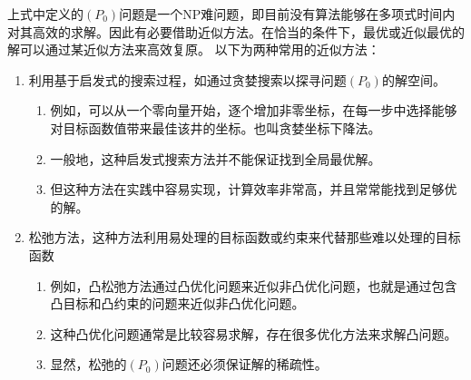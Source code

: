 上式中定义的$ (P_0) $问题是一个NP难问题，即目前没有算法能够在多项式时间内对其高效的求解。因此有必要借助近似方法。在恰当的条件下，最优或近似最优的解可以通过某近似方法来高效复原。
以下为两种常用的近似方法：
\begin{enumerate}
	\item {\heiti 利用基于启发式的搜索过程}，如通过贪婪搜索以探寻问题$ (P_0) $的解空间。
	\begin{enumerate}
		\item 例如，可以从一个零向量开始，逐个增加非零坐标，在每一步中选择能够对目标函数值带来最佳该井的坐标。也叫贪婪坐标下降法。
		\item 一般地，这种启发式搜索方法并不能保证找到全局最优解。
		\item 但这种方法在实践中容易实现，计算效率非常高，并且常常能找到足够优的解。
	\end{enumerate}
    \item {\heiti 松弛方法}，这种方法利用易处理的目标函数或约束来代替那些难以处理的目标函数
    \begin{enumerate}
    	\item 例如，凸松弛方法通过凸优化问题来近似非凸优化问题，也就是通过包含凸目标和凸约束的问题来近似非凸优化问题。
    	\item 这种凸优化问题通常是比较容易求解，存在很多优化方法来求解凸问题。
    	\item 显然，松弛的$ (P_0) $问题还必须保证解的稀疏性。
    \end{enumerate}
\end{enumerate}
